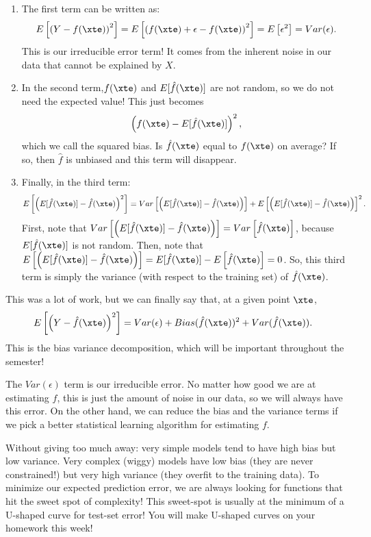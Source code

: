 \begin{enumerate}
\item The first term can be written as:
$$
E\left[\left(Y -f(\xte)\right)^2\right] = E\left[\left(f(\xte)+\epsilon -f(\xte)\right)^2\right] = E\left[\epsilon^2\right] = Var(\epsilon).  
$$
This is our irreducible error term! It comes from the inherent noise in our data that cannot be explained by $X$. 
\item In the second term,$f(\xte)$ and $E[\hat{f}(\xte)]$ are not random, so we do not need the expected value! This just becomes
$$
\left(f(\xte) - E[\hat{f}(\xte)]\right)^2,
$$
which we call the squared bias. Is $\hat{f}(\xte)$ equal to $f(\xte)$ on average? If so, then $\hat{f}$ is unbiased and this term will disappear. 
\item Finally, in the third term: 
$$
 E\left[\left(E[\hat{f}(\xte)] -  \hat{f}(\xte)\right)^2\right] =  Var\left[\left(E[\hat{f}(\xte)] -  \hat{f}(\xte)\right)\right]  + E\left[\left(E[\hat{f}(\xte)] -  \hat{f}(\xte)\right)\right]^2.
$$
First, note that $Var\left[\left(E[\hat{f}(\xte)] -  \hat{f}(\xte)\right)\right] = Var\left[\hat{f}(\xte)\right]$, because $E[\hat{f}(\xte)]$ is not random. Then, note that $E\left[\left(E[\hat{f}(\xte)] -  \hat{f}(\xte)\right)\right] = E[\hat{f}(\xte)] -  E\left[\hat{f}(\xte)\right] = 0$. So, this third term is simply the variance (with respect to the training set) of $\hat{f}(\xte)$. 
\end{enumerate}

This was a lot of work, but we can finally say that, at a given point $\xte$,  
\begin{align*}
 E\left[\left(Y - \hat{f}(\xte)\right)^2 \right] &= Var(\epsilon) + Bias(\hat{f}(\xte))^2 + Var(\hat{f}(\xte)). 
\end{align*}
This is the bias variance decomposition, which will be important throughout the semester! 

The $Var(\epsilon)$ term is our irreducible error. No matter how good we are at estimating $f$, this is just the amount of noise in our data, so we will always have this error. On the other hand, we can reduce the bias and the variance terms if we pick a better statistical learning algorithm for estimating $f$. 

Without giving too much away: very simple models tend to have high bias but low variance. Very complex (wiggy) models have low bias (they are never constrained!) but very high variance (they overfit to the training data). To minimize our expected prediction error, we are always looking for functions that hit the sweet spot of complexity! This sweet-spot is usually at the minimum of a U-shaped curve for test-set error! You will make U-shaped curves on your homework this week!


